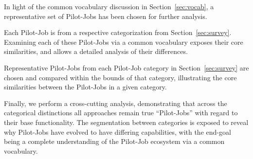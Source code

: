 \documentclass{sig-alternate}
\begin{document}
In light of the common vocabulary discussion in 
Section~\ref{sec:vocab}, a representative set of Pilot-Jobs
has been chosen for further analysis.  


Each Pilot-Job is from a respective categorization from
Section~\ref{sec:survey}.  Examining each of these Pilot-Jobs via a
common vocabulary exposes their core similarities, and allows a
detailed analysis of their differences.

Representative Pilot-Jobs from each Pilot-Job category
in Section~\ref{sec:survey} are chosen and compared within
the bounds of that category, illustrating the core similarities
between the Pilot-Jobs in a given category.


Finally, we perform
a cross-cutting analysis, demonstrating that across the categorical
distinctions all approaches remain true ``Pilot-Jobs'' with regard
to their base functionality.  The segmentation between categories
is exposed to reveal why Pilot-Jobs have evolved to have
differing capabilities, with the end-goal being a
complete understanding of the Pilot-Job ecosystem via a common
vocabulary.

\end{document}
